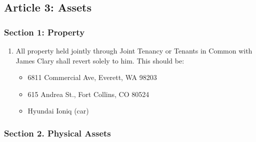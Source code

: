\hypertarget{article-3-assets}{%
\subsection*{Article 3: Assets}\label{article-3-assets}}

\hypertarget{section-1-property}{%
\subsubsection*{Section 1: Property}\label{section-1-property}}

\begin{enumerate}
\def\labelenumi{\arabic{enumi}.}
\tightlist
\item
  All property held jointly through Joint Tenancy or Tenants in Common with James Clary shall revert solely to him. This should be:

  \begin{itemize}
  \tightlist
  \item
    6811 Commercial Ave, Everett, WA 98203
  \item
    615 Andrea St., Fort Collins, CO 80524
  \item
    Hyundai Ioniq (car)
  \end{itemize}
\end{enumerate}

\hypertarget{section-2.-physical-assets}{%
\subsubsection*{Section 2. Physical Assets}\label{section-2.-physical-assets}}

